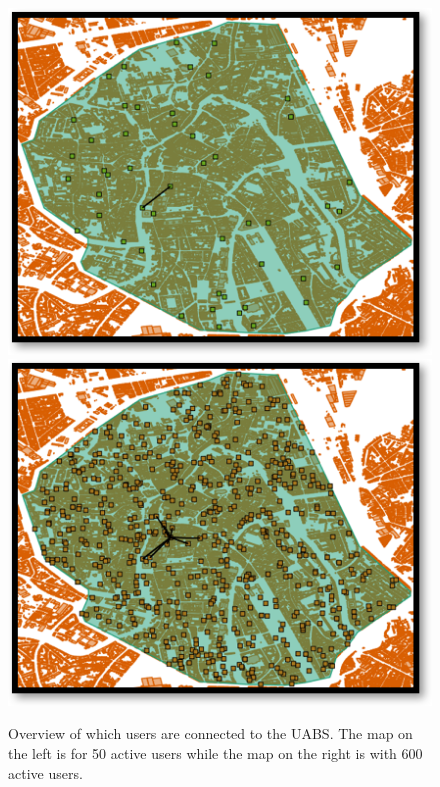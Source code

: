 \documentclass[twocolumn]{phdsymp} %
\begin{document}
\begin{figure}[!htb]
  \includegraphics[width=\linewidth]{../images/connectionsMap50Users.png}
\endminipage\hfill
{}%
  \includegraphics[width=\linewidth]{../images/connectionsMap600Users.png}
\endminipage
  \caption{Overview of which users are connected to the \gls{UABS}. The map on the left is for 50 active users while the map on the right is with 600 active users.}
  \label{fig:connectionMap}
\end{figure}
\end{document}
